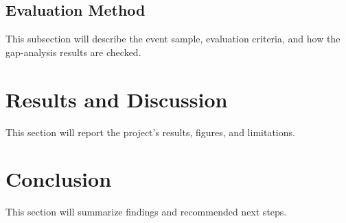 \documentclass[11pt]{article}
\begin{document}
\subsection{Evaluation Method}
This subsection will describe the event sample, evaluation criteria, and how the gap-analysis results are checked.


\section{Results and Discussion}

This section will report the project’s results, figures, and limitations.

\section{Conclusion}

This section will summarize findings and recommended next steps.



\end{document}
